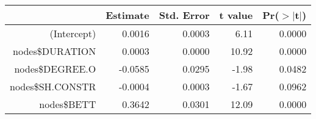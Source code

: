 \documentclass{article}
\begin{document}


\begin{table}[ht]
\centering
\begin{tabular}{rrrrr}
  \hline
 & Estimate & Std. Error & t value & Pr($>$$|$t$|$) \\ 
  \hline
(Intercept) & 0.0016 & 0.0003 & 6.11 & 0.0000 \\ 
  nodes\$DURATION & 0.0003 & 0.0000 & 10.92 & 0.0000 \\ 
  nodes\$DEGREE.O & -0.0585 & 0.0295 & -1.98 & 0.0482 \\ 
  nodes\$SH.CONSTR & -0.0004 & 0.0003 & -1.67 & 0.0962 \\ 
  nodes\$BETT & 0.3642 & 0.0301 & 12.09 & 0.0000 \\ 
   \hline
\end{tabular}
\end{table}
\end{document}
